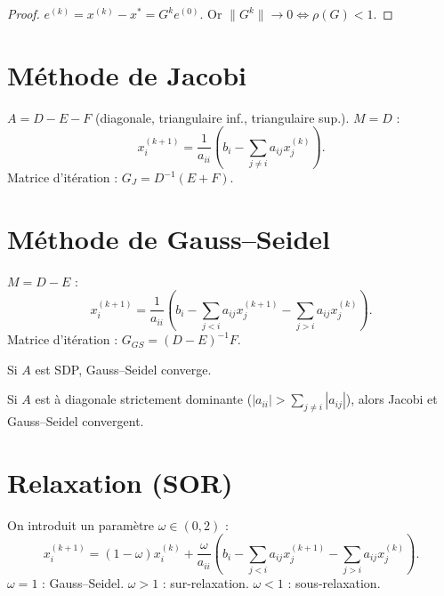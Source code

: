 \begin{proof}
$e^{(k)}=x^{(k)}-x^*=G^k e^{(0)}$. Or $\|G^k\|\to 0 \iff \rho(G)<1$.
\end{proof}

\section{M\'ethode de Jacobi}

\begin{definition}
$A=D-E-F$ (diagonale, triangulaire inf., triangulaire sup.). $M=D$ :
\[
x_i^{(k+1)} = \frac{1}{a_{ii}}\left(b_i-\sum_{j\neq i}a_{ij}x_j^{(k)}\right).
\]
Matrice d'it\'eration : $G_J=D^{-1}(E+F)$.
\end{definition}

\section{M\'ethode de Gauss--Seidel}

\begin{definition}
$M=D-E$ :
\[
x_i^{(k+1)} = \frac{1}{a_{ii}}\left(b_i-\sum_{j<i}a_{ij}x_j^{(k+1)}-\sum_{j>i}a_{ij}x_j^{(k)}\right).
\]
Matrice d'it\'eration : $G_{GS}=(D-E)^{-1}F$.
\end{definition}

\begin{theoreme}
Si $A$ est SDP, Gauss--Seidel converge.
\end{theoreme}

\begin{theoreme}
Si $A$ est \`a diagonale strictement dominante ($|a_{ii}|>\sum_{j\neq i}|a_{ij}|$), alors Jacobi et Gauss--Seidel convergent.
\end{theoreme}

\section{Relaxation (SOR)}

\begin{definition}
On introduit un param\`etre $\omega\in(0,2)$ :
\[
x_i^{(k+1)} = (1-\omega)x_i^{(k)} + \frac{\omega}{a_{ii}}\left(b_i-\sum_{j<i}a_{ij}x_j^{(k+1)}-\sum_{j>i}a_{ij}x_j^{(k)}\right).
\]
$\omega=1$ : Gauss--Seidel. $\omega>1$ : sur-relaxation. $\omega<1$ : sous-relaxation.
\end{definition}

